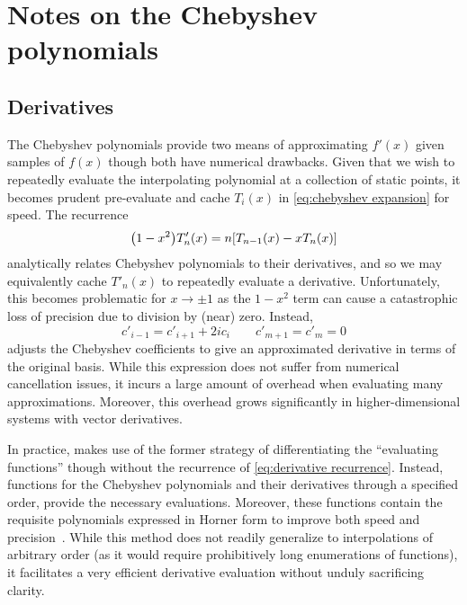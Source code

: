 \section{Notes on the Chebyshev polynomials}

\subsection{Derivatives}
The Chebyshev polynomials provide two means of approximating $f'(x)$ given samples of $f(x)$ though both have numerical drawbacks.
Given that we wish to repeatedly evaluate the interpolating polynomial at a collection of static points, it becomes prudent pre-evaluate and cache $T_i(x)$ in \cref{eq:chebyshev expansion} for speed.
The recurrence
\begin{equation}
  \qty(1 - x^2) T_n'(x) = n \qty[T_{n-1}(x) - x T_n(x)]
  \label{eq:derivative recurrence}
\end{equation}
analytically relates Chebyshev polynomials to their derivatives, and so we may equivalently cache $T'_n(x)$ to repeatedly evaluate a derivative.
Unfortunately, this becomes problematic for $x \to \pm 1$ as the $1-x^2$ term can cause a catastrophic loss of precision due to division by (near) zero.
Instead,
\begin{equation}
  c'_{i-1} = c'_{i+1} + 2 i c_i \qquad c'_{m+1} = c'_m = 0
\end{equation}
adjusts the Chebyshev coefficients to give an approximated derivative in terms of the original basis.
While this expression does not suffer from numerical cancellation issues, it incurs a large amount of overhead when evaluating many approximations.
Moreover, this overhead grows significantly in higher-dimensional systems with vector derivatives.

In practice, \QuEST{} makes use of the former strategy of differentiating the ``evaluating functions'' though without the recurrence of \cref{eq:derivative recurrence}.
Instead, functions for the Chebyshev polynomials and their derivatives through a specified order, provide the necessary evaluations.
Moreover, these functions contain the requisite polynomials expressed in Horner form to improve both speed and precision~\cite{}.
While this method does not readily generalize to interpolations of arbitrary order (as it would require prohibitively long enumerations of functions), it facilitates a very efficient derivative evaluation without unduly sacrificing clarity.

